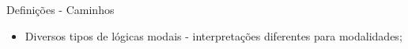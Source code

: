 \begin{frame}{Definições - Caminhos}
    \begin{itemize}
        \item Diversos tipos de lógicas modais - interpretações diferentes para modalidades;
    \end{itemize}
\end{frame}